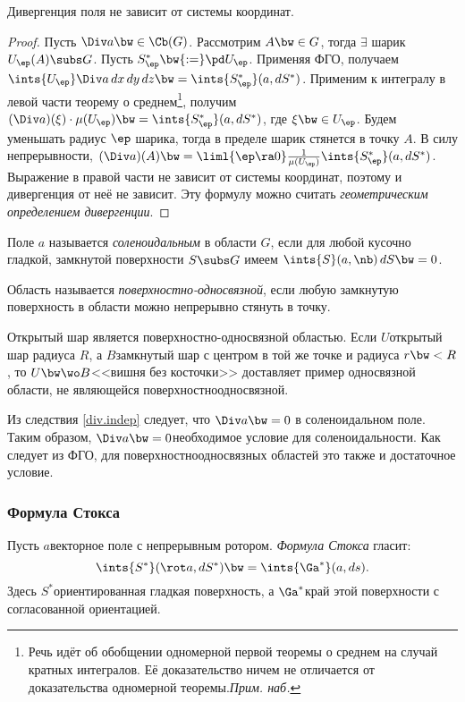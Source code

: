\documentclass[a4paper]{article}
\begin{document}
\begin{imp}\label{div.indep}
Дивергенция поля не зависит от системы координат.
\end{imp}
\begin{proof}
Пусть $\Div a \bw\in \Cb(G)$. Рассмотрим $A \bw\in G$, тогда $\exi$ шарик $U_\ep(A) \subs G$. Пусть
$S^*_\ep \bw{:=} \pd U_\ep$. Применяя ФГО, получаем $\ints{U_\ep} \Div a \,d x \,d y \,d z \bw=
\ints{S^*_\ep}(a, d S^*)$. Применим к интегралу в левой части теорему о среднем\footnote{Речь идёт об
обобщении одномерной первой теоремы о среднем на случай кратных интегралов. Её доказательство
ничем не отличается от доказательства одномерной теоремы.\т \emph{Прим. наб.}}, получим $(\Div a)(\xi)\cdot \mu(U_\ep)
\bw= \ints{S^*_\ep}(a, d S^*)$, где $\xi \bw\in U_\ep$. Будем уменьшать радиус $\ep$ шарика, тогда в
пределе шарик стянется в точку $A$. В силу непрерывности, $(\Div a)(A) \bw= \liml{\ep \ra 0}
\frac{1}{\mu(U_\ep)} \ints{S^*_\ep}(a, d S^*)$. Выражение в правой части не зависит от системы координат,
поэтому и дивергенция от неё не зависит. Эту формулу можно считать \emph{геометрическим определением
дивергенции}.
\end{proof}

\begin{df}
Поле $a$ называется \emph{соленоидальным} в области $G$, если для любой кусочно гладкой, замкнутой
поверхности $S \subs G$ имеем $\ints{S}(a,\nb) \,d S \bw= 0$.
\end{df}

\begin{df}
Область называется \emph{поверхностно-односвязной}, если любую замкнутую поверхность в области
можно непрерывно стянуть в точку.
\end{df}
\begin{ex}
Открытый шар является поверхностно-односвязной областью. Если $U$\т открытый шар радиуса $R$, а
$B$\т замкнутый шар с центром в той же точке и радиуса $r \bw< R$, то $U \bw\wo B$\т <<вишня
без косточки>> доставляет пример односвязной области, не являющейся поверхностно\д односвязной.
\end{ex}

Из следствия \ref{div.indep} следует, что $\Div a \bw= 0$ в соленоидальном поле. Таким
образом, $\Div a \bw= 0$\т необходимое условие для соленоидальности. Как следует из ФГО,
для поверхностно\д односвязных областей это также и достаточное условие.

\subsubsection{Формула Стокса}
Пусть $a$\т векторное поле с непрерывным ротором. \emph{Формула Стокса} гласит:
$$
  \ints{S^*}(\rot a, d S^*) \bw= \ints{\Ga^*}(a, d s).
$$
Здесь $S^*$\т ориентированная гладкая поверхность, а $\Ga^*$\т край этой поверхности с
согласованной ориентацией.
\end{document}
